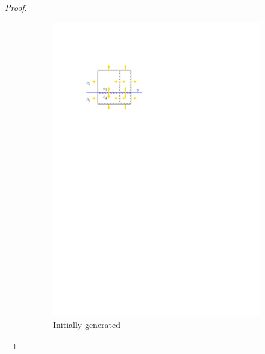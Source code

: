 \documentclass[english,gradu]{tktltiki2018}
\begin{document}
\begin{proof}
\begin{figure}\centering
	\begin{subfigure}[t]{0.3\textwidth}\centering
		\includegraphics[width=\textwidth,page=1]{fig/addeproof}
		\caption{Initially generated \addEs}\label{fig:addeproof:start}
	\end{subfigure}
	\hfil
	\begin{subfigure}[t]{0.3\textwidth}\centering

\end{subfigure}
\end{figure}
\end{proof}
\end{document}

